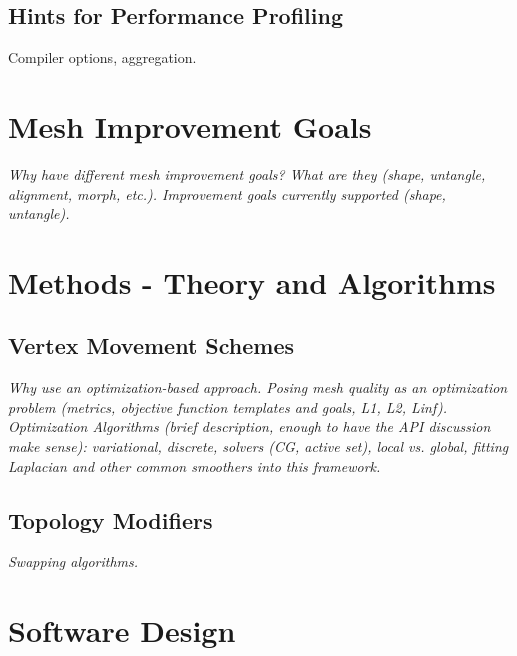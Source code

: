 \documentclass[psfig]{article}
\begin{document}
\subsection{Hints for Performance Profiling}
Compiler options, aggregation.

\section{Mesh Improvement Goals}

{\it Why have different mesh improvement goals? What are they (shape,
untangle, alignment, morph, etc.). Improvement goals currently
supported (shape, untangle).  }

\section{Methods - Theory and Algorithms}

\subsection{Vertex Movement Schemes}

{\it Why use an optimization-based approach. Posing mesh quality as an
optimization problem (metrics, objective function templates and goals,
L1, L2, Linf).  Optimization Algorithms (brief description, enough to
have the API discussion make sense): variational, discrete, solvers
(CG, active set), local vs. global, fitting Laplacian and other common
smoothers into this framework.}

\subsection{Topology Modifiers}

{\it Swapping algorithms.}

\section{Software Design}
\label{sec:arch}
\end{document}
